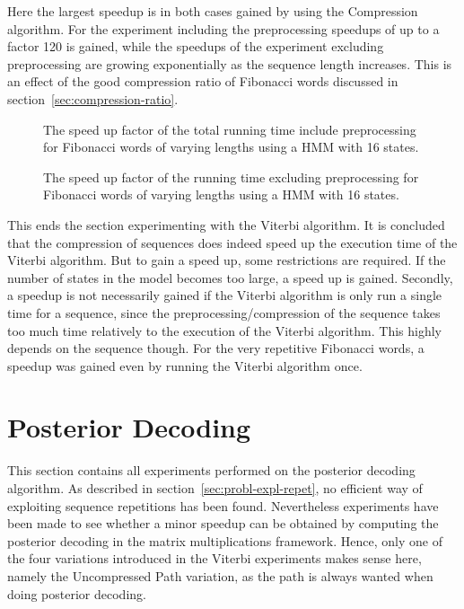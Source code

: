 Here the largest speedup is in both cases gained by using the Compression
algorithm. For the experiment including the preprocessing speedups of up to a
factor 120 is gained, while the speedups of the experiment excluding
preprocessing are growing exponentially as the sequence length
increases. This is an effect of the good compression ratio of Fibonacci words
discussed in section~\ref{sec:compression-ratio}.

\begin{figure}
  \centering
  
  \caption{The speed up factor of the total running time include preprocessing
    for Fibonacci words of varying lengths using a HMM with 16 states.}
  \label{fig:fib_speedup_vs_sequence_length}
\end{figure}

\begin{figure}
  \centering
  
  \caption{The speed up factor of the running time excluding preprocessing for
    Fibonacci words of varying lengths using a HMM with 16 states.}
  \label{fig:fib_speedup_vs_sequence_length2}
\end{figure}

This ends the section experimenting with the Viterbi algorithm. It is concluded
that the compression of sequences does indeed speed up the execution time of
the Viterbi algorithm. But to gain a speed up, some restrictions are
required. If the number of states in the model becomes too large, a speed up is
gained. Secondly, a speedup is not necessarily gained if the Viterbi algorithm
is only run a single time for a sequence, since the preprocessing/compression of
the sequence takes too much time relatively to the execution of the Viterbi
algorithm. This highly depends on the sequence though. For the very repetitive
Fibonacci words, a speedup was gained even by running the Viterbi algorithm once.

\section{Posterior Decoding}

This section contains all experiments performed on the posterior decoding
algorithm. As described in section~\ref{sec:probl-expl-repet}, no efficient way
of exploiting sequence repetitions has been found. Nevertheless experiments
have been made to see whether a minor speedup can be obtained by computing the
posterior decoding in the matrix multiplications framework. Hence, only one of
the four variations introduced in the Viterbi experiments makes sense here,
namely the Uncompressed Path variation, as the path is always wanted when doing
posterior decoding.

